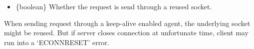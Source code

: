 \begin{itemize}
\tightlist
\item
  \{boolean\} Whether the request is send through a reused socket.
\end{itemize}

When sending request through a keep-alive enabled agent, the underlying
socket might be reused. But if server closes connection at unfortunate
time, client may run into a `ECONNRESET' error.

\begin{Shaded}
\begin{Highlighting}[]
 \OperatorTok{;}

  \OperatorTok{,}\KeywordTok{=\textgreater{}}\NormalTok{ \{}
\NormalTok{(}\StringTok{\textquotesingle{}}\NormalTok{)}\OperatorTok{;}
\NormalTok{()}\OperatorTok{;}
\NormalTok{  \})}
  \NormalTok{(}\NormalTok{)}\OperatorTok{;}

\NormalTok{(() }\KeywordTok{=\textgreater{}}\NormalTok{ \{}
\NormalTok{(}\OperatorTok{,}\OperatorTok{,}\KeywordTok{=\textgreater{}}\NormalTok{ \{}
\NormalTok{(}\OperatorTok{,}\KeywordTok{=\textgreater{}}\NormalTok{ \{}
\NormalTok{    \})}\OperatorTok{;}
\NormalTok{  \})}\OperatorTok{;}
\NormalTok{\}}\OperatorTok{,} \NormalTok{)}\OperatorTok{;} 
\end{Highlighting}
\end{Shaded}

